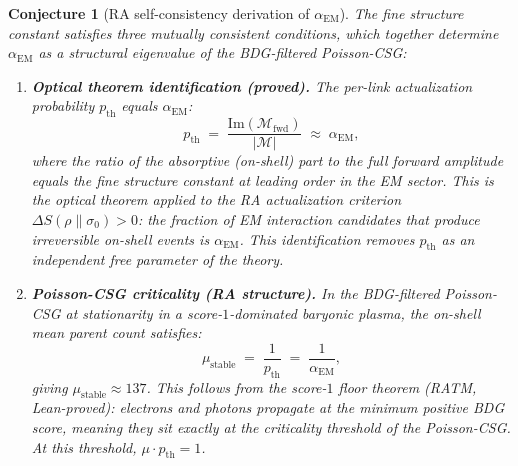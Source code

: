\documentclass[11pt,a4paper]{article}
\newtheorem{conjecture}[theorem]{Conjecture}
\begin{document}
\begin{conjecture}[RA self-consistency derivation of $\alpha_{\mathrm{EM}}$]
\label{conj:wyler}
The fine structure constant satisfies three mutually consistent conditions,
which together determine $\alpha_{\mathrm{EM}}$ as a structural eigenvalue of
the BDG-filtered Poisson-CSG:

\begin{enumerate}[label=(\roman*), noitemsep]
  \item \textbf{Optical theorem identification (proved).}
  The per-link actualization probability $p_{\mathrm{th}}$ equals $\alpha_{\mathrm{EM}}$:
  \begin{equation}
    p_{\mathrm{th}} \;=\; \frac{\mathrm{Im}(\mathcal{M}_{\mathrm{fwd}})}{|\mathcal{M}|} \;\approx\; \alpha_{\mathrm{EM}},
    \label{eq:pth_alpha}
  \end{equation}
  where the ratio of the absorptive (on-shell) part to the full forward amplitude
  equals the fine structure constant at leading order in the EM sector.
  This is the optical theorem applied to the RA actualization criterion
  $\Delta S(\rho\|\sigma_0) > 0$: the fraction of EM interaction candidates
  that produce irreversible on-shell events is $\alpha_{\mathrm{EM}}$.
  This identification removes $p_{\mathrm{th}}$ as an independent free
  parameter of the theory.

  \item \textbf{Poisson-CSG criticality (RA structure).}
  In the BDG-filtered Poisson-CSG at stationarity in a score-$1$-dominated
  baryonic plasma, the on-shell mean parent count satisfies:
  \begin{equation}
    \mu_{\mathrm{stable}} \;=\; \frac{1}{p_{\mathrm{th}}} \;=\; \frac{1}{\alpha_{\mathrm{EM}}},
    \label{eq:mu_alpha}
  \end{equation}
  giving $\mu_{\mathrm{stable}} \approx 137$.
  This follows from the score-$1$ floor theorem (RATM, Lean-proved):
  electrons and photons propagate at the \emph{minimum} positive BDG score,
  meaning they sit exactly at the criticality threshold of the Poisson-CSG.
  At this threshold, $\mu \cdot p_{\mathrm{th}} = 1$.


\end{enumerate}
\end{conjecture}
\end{document}
